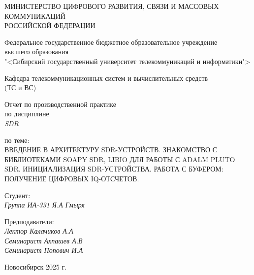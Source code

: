 \thispagestyle{empty}

\begin{center}
    МИНИСТЕРСТВО ЦИФРОВОГО РАЗВИТИЯ, СВЯЗИ И МАССОВЫХ КОММУНИКАЦИЙ \\ РОССИЙСКОЙ ФЕДЕРАЦИИ

    \vspace{20pt}

    Федеральное государственное бюджетное образовательное учреждение  \\  высшего образования \\
    "<Сибирский государственный университет телекоммуникаций и информатики"> \\

    \vspace{20pt}

    Кафедра телекоммуникационных систем и вычислительных средств \\  (ТС и ВС)
\end{center}

\vfill

\begin{center}
    Отчет по производственной практике \\  
    по дисциплине \\
    \textit{SDR}

    \vspace{20pt}
    по теме: \\
    \uppercase{Введение в архитектуру SDR-устройств. Знакомство с библиотеками Soapy SDR, Libio для работы с Adalm Pluto SDR. 
    Инициализация SDR-устройства. Работа с буфером: получение цифровых IQ-отсчетов.}
\end{center}

\vfill

    \noindent Студент: \\
    \textit{Группа ИА-331 \hfill Я.А Гмыря}

    \vspace{20pt}

    \noindent Предподаватели: \\
    \textit{Лектор \hfill Калачиков А.А} \\
    \textit{Семинарист \hfill Ахпашев А.В} \\
    \textit{Семинарист \hfill Попович И.А}

\vfill

\begin{center}
    Новосибирск 2025 г.
\end{center}